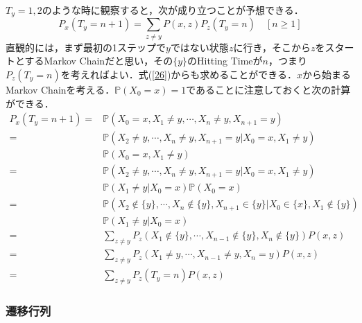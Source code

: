 \documentclass[12pt, a4paper]{jsarticle}
\theoremstyle{definition}
\begin{document}
$T_y = 1,2$のような時に観察すると，次が成り立つことが予想できる．
\begin{equation}
	P_x(T_y = n+1) =  \sum_{z \neq y}P(x,z)P_z(T_y = n) \quad [n \geq 1]　
\end{equation}
直観的には，まず最初の1ステップで$y$ではない状態$z$に行き，そこから$z$をスタートとするMarkov Chainだと思い，その$\{y\}$のHitting Timeが$n$，つまり$P_z(T_y = n)$を考えればよい．式(\ref{26})からも求めることができる．$x$から始まるMarkov Chainを考える．$\mathbb{P}(X_0 = x) = 1$であることに注意しておくと次の計算ができる．
\begin{align*}
P_x(T_y = n+1) =& \mathbb{P}(X_0 = x ,X_1 \neq y, \cdots, X_n \neq y, X_{n+1} = y) \\
=& \mathbb{P}(X_2 \neq y,\cdots,X_n\neq y, X_{n+1} = y | X_0 = x, X_1 \neq y)\\
& \mathbb{P}(X_0 = x,X_1 \neq y) \\
=& \mathbb{P}(X_2 \neq y,\cdots,X_n\neq y, X_{n+1} = y | X_0 = x, X_1 \neq y)\\
& \mathbb{P}(X_1 \neq y | X_0 = x)\mathbb{P}(X_0 = x) \\
=& \mathbb{P}(X_2 \notin \{y\},\cdots,X_n \notin \{y\}, X_{n+1} \in \{y\} | X_0 \in \{x\}, X_1 \notin \{y\})  \\
& \mathbb{P}(X_1 \neq y | X_0 = x) \\
=& \sum_{z \neq y}P_z(X_1\notin \{y\} , \cdots , X_{n-1} \notin \{y\}, X_n \notin \{y\}) P(x,z) \\
=& \sum_{z \neq y}P_z(X_1\neq y , \cdots , X_{n-1} \neq y, X_n = y) P(x,z) \\
=& \sum_{z \neq y}P_z(T_y = n) P(x,z)
\end{align*}

\subsubsection{遷移行列}
\end{document}
